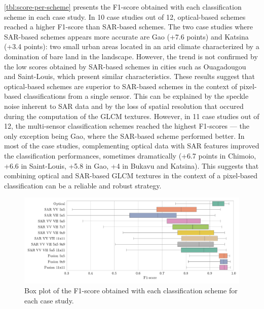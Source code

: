 \documentclass[remotesensing,article,submit,moreauthors,pdftex,10pt,a4paper]{Definitions/mdpi}
\begin{document}
\autoref{tbl:score-per-scheme} presents the F1-score obtained with each
classification scheme in each case study. In 10 case studies out of 12,
optical-based schemes reached a higher F1-score than SAR-based schemes. The two
case studies where SAR-based schemes appears more accurate are Gao (+7.6 points)
and Katsina (+3.4 points): two small urban areas located in an arid climate
characterized by a domination of bare land in the landscape. However, the trend
is not confirmed by the low scores obtained by SAR-based schemes in cities such
as Ouagadougou and Saint-Louis, which present similar characteristics. These
results suggest that optical-based schemes are superior to SAR-based schemes in
the context of pixel-based classifications from a single sensor. This can be
explained by the speckle noise inherent to SAR data and by the loss of spatial
resolution that occured during the computation of the GLCM textures. However, in
11 case studies out of 12, the multi-sensor classification schemes reached the
highest F1-scores --- the only exception being Gao, where the SAR-based scheme
performed better. In most of the case studies, complementing optical data with
SAR features improved the classification performances, sometimes dramatically
(+6.7 points in Chimoio, +6.6 in Saint-Louis, +5.8 in Gao, +4 in Bukavu and
Katsina). This suggests that combining optical and SAR-based GLCM textures in
the context of a pixel-based classification can be a reliable and robust
strategy.

\begin{figure}[H]
    \centering
    \includegraphics[width=\textwidth]{figures/score_per_scheme_boxplot.pdf}
    \caption{Box plot of the F1-score obtained with each classification
    scheme for each case study.}
    \label{fig:scores-boxplot}
\end{figure}
\end{document}

